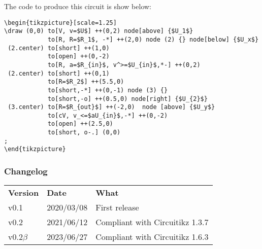 \documentclass[12pt]{article}
\begin{document}
The code to produce this circuit is show below:

\begin{lstlisting}
\begin{tikzpicture}[scale=1.25]
\draw (0,0) to[V, v=$U$] ++(0,2) node[above] {$U_1$}
            to[R, R=$R_1$, -*] ++(2,0) node (2) {} node[below] {$U_x$}
 (2.center) to[short] ++(1,0)
            to[open] ++(0,-2)
            to[R, a=$R_{in}$, v^>=$U_{in}$,*-] ++(0,2) 
 (2.center) to[short] ++(0,1)
            to[R=$R_2$] ++(5.5,0)
            to[short,-*] ++(0,-1) node (3) {}
			to[short,-o] ++(0.5,0) node[right] {$U_{2}$}
 (3.center) to[R=$R_{out}$] ++(-2,0)  node [above] {$U_y$}
            to[cV, v_<=$aU_{in}$,-*] ++(0,-2)
			to[open] ++(2.5,0)
            to[short, o-.] (0,0)
;
\end{tikzpicture}
\end{lstlisting}
\subsubsection*{Changelog}

\begin{table}[!ht]
\begin{tabular}{lll}
\textbf{Version} & \textbf{Date} & \textbf{What} \\
v0.1    & 2020/03/08 & First release\\
v0.2    & 2021/06/12 & Compliant with Circuitikz 1.3.7\\
v0.2$\beta$  & 2023/06/27 & Compliant with Circuitikz 1.6.3
\end{tabular}
\end{table}
\end{document}
